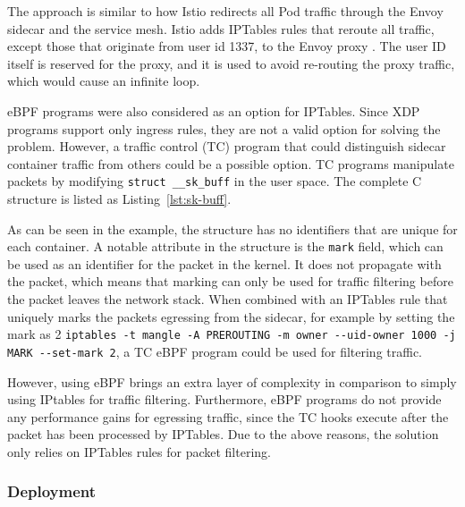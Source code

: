 \documentclass[english, 12pt, a4paper, sci, utf8, a-2b, online]{aaltothesis}
\begin{document}


The approach is similar to how Istio redirects all Pod traffic through the Envoy sidecar and the service mesh.
Istio adds IPTables rules that reroute all traffic, except those that originate from user id 1337, to the Envoy proxy \cite{istio-iptables}.
The user ID itself is reserved for the proxy, and it is used to avoid re-routing the proxy traffic, which would cause an infinite loop.

eBPF programs were also considered as an option for IPTables.
Since XDP programs support only ingress rules, they are not a valid option for solving the problem.
However, a traffic control (TC) program that could distinguish sidecar container traffic from others could be a possible option.
TC programs manipulate packets by modifying \lstinline{struct __sk_buff} in the user space.
The complete C structure is listed as Listing~\ref{lst:sk-buff}.



As can be seen in the example, the structure has no identifiers that are unique for each container.
A notable attribute in the structure is the \lstinline{mark} field, which can be used as an identifier for the packet in the kernel.
It does not propagate with the packet, which means that marking can only be used for traffic filtering before the packet leaves the network stack.
When combined with an IPTables rule that uniquely marks the packets egressing from the sidecar, for example by setting the mark as 2 \lstinline{iptables -t mangle -A PREROUTING -m owner --uid-owner 1000 -j MARK --set-mark 2}, a TC eBPF program could be used for filtering traffic.

However, using eBPF brings an extra layer of complexity in comparison to simply using IPtables for traffic filtering.
Furthermore, eBPF programs do not provide any performance gains for egressing traffic, since the TC hooks execute after the packet has been processed by IPTables.
Due to the above reasons, the solution only relies on IPTables rules for packet filtering.

\subsubsection{Deployment} \label{sec:network-solution:deployment}
\end{document}
